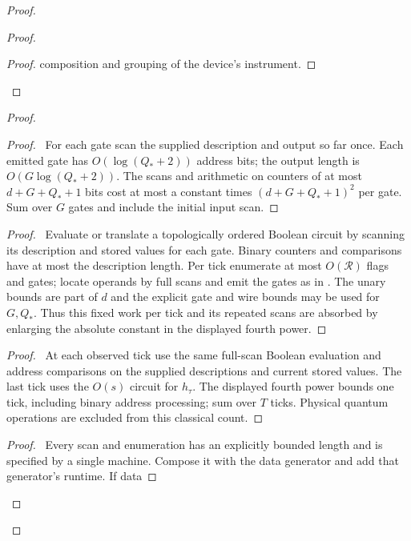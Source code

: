 \begin{proof}
\begin{proof}
\begin{proof}
  composition and grouping of the device's instrument.\end{proof}
 \end{proof}
\begin{proof}
 \begin{proof}\pf\ For each gate scan the supplied description and
 output so far once. Each emitted gate has
 $O(\log(Q_*+2))$ address bits; the output length is
 $O(G\log(Q_*+2))$. The scans and arithmetic on counters of at most
 $d+G+Q_*+1$ bits cost at most a constant times
 $(d+G+Q_*+1)^2$ per gate. Sum over $G$ gates and include the
 initial input scan.\end{proof}
 \begin{proof}\pf\ Evaluate or translate a topologically ordered
 Boolean circuit by scanning its description and stored values for
 each gate. Binary counters and comparisons have at most the
 description length. Per tick enumerate at most $O(\mathcal R)$
 flags and gates; locate operands by full scans and emit the gates
 as in . The unary bounds are part
 of $d$ and the explicit gate and wire bounds may be used for
 $G,Q_*$. Thus this fixed work per tick and its repeated scans are
 absorbed by enlarging the absolute constant in the displayed
 fourth power.\end{proof}
 \begin{proof}\pf\ At each observed tick use the same full-scan
 Boolean evaluation and address comparisons on the supplied
 descriptions and current stored values. The last tick uses the
 $O(s)$ circuit for $h_\tau$. The displayed fourth power bounds
 one tick, including binary address processing; sum over $T$ ticks.
 Physical quantum operations are excluded from this classical count.
 \end{proof}
 \begin{proof}\pf\ Every scan and enumeration has an explicitly
 bounded length and is specified by a single machine. Compose it
 with the data generator and add that generator's runtime. If data

\end{proof}
\end{proof}
\end{proof}
